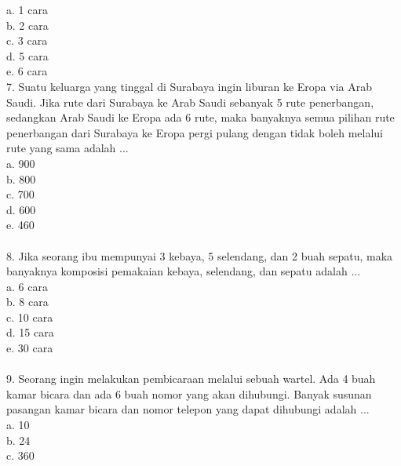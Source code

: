 \documentclass[11pt,fleqn]{book} %
\begin{document}
a.	1 cara\\

b.	2 cara\\

c.	3 cara\\

d.	5 cara\\

e.	6 cara\\

7. Suatu keluarga yang tinggal di Surabaya ingin liburan ke Eropa via Arab Saudi. Jika rute dari Surabaya ke Arab Saudi sebanyak 5 rute penerbangan, sedangkan Arab Saudi ke Eropa ada 6 rute, maka banyaknya semua pilihan rute penerbangan dari Surabaya ke Eropa pergi pulang dengan tidak boleh melalui rute yang sama adalah ...\\

a.	900\\

b.	800\\

c.	700\\

d.	600\\

e.	460\\
\\

8. Jika seorang ibu mempunyai 3 kebaya, 5 selendang, dan 2 buah sepatu, maka banyaknya komposisi pemakaian kebaya, selendang, dan sepatu adalah ...\\

a.	6 cara\\

b.	8 cara\\

c.	10 cara\\

d.	15 cara\\

e.	30 cara\\
\\

9. Seorang ingin melakukan pembicaraan melalui sebuah wartel. Ada 4 buah kamar bicara dan ada 6 buah nomor yang akan dihubungi. Banyak susunan pasangan kamar bicara dan nomor telepon yang dapat dihubungi adalah ...\\ 

a.	10\\

b.	24\\

c.	360\\
\end{document}

